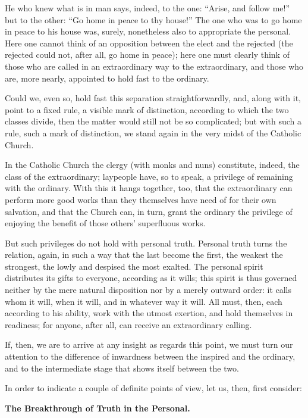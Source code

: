 \documentclass[12pt,a4paper]{book}
\begin{document}
He who knew what is in man says, indeed, to the one: ``Arise, and follow me!'' but to the other: ``Go home in peace to thy house!'' The one who was to go home in peace to his house was, surely, nonetheless also to appropriate the personal. Here one cannot think of an opposition between the elect and the rejected (the rejected could not, after all, go home in peace); here one must clearly think of those who are called in an extraordinary way to the extraordinary, and those who are, more nearly, appointed to hold fast to the ordinary.

Could we, even so, hold fast this separation straightforwardly, and, along with it, point to a fixed rule, a visible mark of distinction, according to which the two classes divide, then the matter would still not be so complicated; but with such a rule, such a mark of distinction, we stand again in the very midst of the Catholic Church.

In the Catholic Church the clergy (with monks and nuns) constitute, indeed, the class of the extraordinary; laypeople have, so to speak, a privilege of remaining with the ordinary. With this it hangs together, too, that the extraordinary can perform more good works than they themselves have need of for their own salvation, and that the Church can, in turn, grant the ordinary the privilege of enjoying the benefit of those others' superfluous works.

But such privileges do not hold with personal truth. Personal truth turns the relation, again, in such a way that the last become the first, the weakest the strongest, the lowly and despised the most exalted. The personal spirit distributes its gifts to everyone, according as it wills; this spirit is thus governed neither by the mere natural disposition nor by a merely outward order: it calls whom it will, when it will, and in whatever way it will. All must, then, each according to his ability, work with the utmost
exertion, and hold themselves in readiness; for anyone, after all, can receive an extraordinary calling.

If, then, we are to arrive at any insight as regards this point, we must turn our attention to the difference of inwardness between the inspired and the ordinary, and to the intermediate stage that shows itself between the two.

In order to indicate a couple of definite points of view, let us, then, first consider:

\begin{center}
\textbf{The Breakthrough of Truth in the Personal.}
\end{center}
\end{document}
